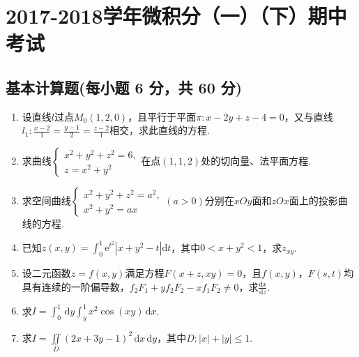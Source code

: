 \documentclass[../Main.tex]{subfiles}
\begin{document}
\chapter{2017-2018学年微积分（一）（下）期中考试}

\section{基本计算题(每小题 6 分，共 60 分)}
\begin{enumerate}
    \item 设直线$l$过点$M_{0}(1,2,0)$，且平行于平面$\pi:x-2y+z-4=0$，又与直线$l_{1}
              :\frac{x-2}{1}=\frac{y-1}{2}=\frac{z-2}{1}$相交，求此直线的方程.
          \vspace{10em}

    \item 求曲线$\begin{cases}
                  x^{2}+y^{2}+z^{2}=6, \\
                  z=x^{2}+y^{2}
              \end{cases}$在点$(1,1,2)$处的切向量、法平面方程.
          \vspace{10em}

    \item 求空间曲线$\begin{cases}
                  x^{2}+y^{2}+z^{2}=a^{2}, \\
                  x^{2}+y^{2}=ax
              \end{cases}(a>0)$分别在$xOy$面和$zOx$面上的投影曲线的方程.
          \vspace{10em}

    \item 已知$z(x,y)=\int_{0}^{1}\mathrm{e}^{t^2}\left|x+y^{2}-t\right|\mathrm{d}
              t$，其中$0<x+y^{2}<1$，求$z_{xy}$.
          \vspace{13em}

    \item 设二元函数$z=f(x,y)$满足方程$F(x+z,xy)=0$，且$f(x,y)$，$F(s,t)$均具有连续的一阶偏导数，$f
                  _{2} F_{1}+y f_{2} F_{2} -x f_{1} F_{2} \neq 0$，求$\frac{\mathrm{d}x}{\mathrm{d}z}$.
          \vspace{12em}

    \item 求$I=\int_{0}^{1}\,\mathrm{d}y\int_{y}^{1}x^{2}\cos(xy)\,\mathrm{d}x$.
          \vspace{12em}

    \item 求$I=\iint\limits_{D}\left(2x+3y-1\right)^{2}\,\mathrm{d}x\,\mathrm{d}y$，其中$D
              :|x|+|y|\leq 1$.
          \vspace{13em}


\end{enumerate}
\end{document}
